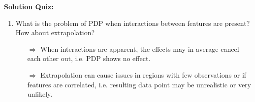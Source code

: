 \textbf{Solution Quiz:}\\\noindent
\medskip

\begin{enumerate}
    \item What is the problem of PDP when interactions between features are present? How about extrapolation?
    \begin{itemize}
    	\item[$\Rightarrow$] When interactions are apparent, the effects may in average cancel each other out, i.e. PDP shows no effect.
    \item[$\Rightarrow$] Extrapolation can cause issues in regions with few observations or if features are correlated, i.e. resulting data point may be unrealistic or very unlikely.
    \end{itemize}

\end{enumerate}
